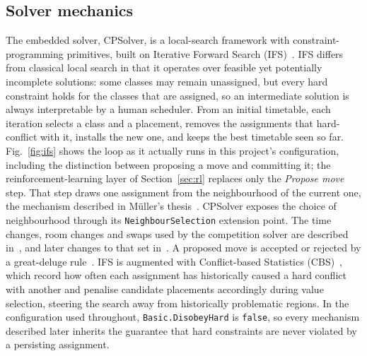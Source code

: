 \documentclass[journal]{IEEEtran}
\begin{document}
\subsection{Solver mechanics}
The embedded solver, CPSolver, is a local-search framework with constraint-programming primitives, built on Iterative Forward Search (IFS)~\cite{muller2004constraint}. IFS differs from classical local search in that it operates over feasible yet potentially incomplete solutions: some classes may remain unassigned, but every hard constraint holds for the classes that are assigned, so an intermediate solution is always interpretable by a human scheduler. From an initial timetable, each iteration selects a class and a placement, removes the assignments that hard-conflict with it, installs the new one, and keeps the best timetable seen so far. Fig.~\ref{fig:ifs} shows the loop as it actually runs in this project's configuration, including the distinction between proposing a move and committing it; the reinforcement-learning layer of Section~\ref{sec:rl} replaces only the \emph{Propose move} step. That step draws one assignment from the neighbourhood of the current one, the mechanism described in M\"uller's thesis~\cite{muller2005thesis}. CPSolver exposes the choice of neighbourhood through its \texttt{NeighbourSelection} extension point. The time changes, room changes and swaps used by the competition solver are described in~\cite{muller2009itc}, and later changes to that set in~\cite{muller2016evolution}. A proposed move is accepted or rejected by a great-deluge rule~\cite{dueck1993deluge}. IFS is augmented with Conflict-based Statistics (CBS)~\cite{muller2004constraint}, which record how often each assignment has historically caused a hard conflict with another and penalise candidate placements accordingly during value selection, steering the search away from historically problematic regions. In the configuration used throughout, \texttt{Basic.DisobeyHard} is \texttt{false}, so every mechanism described later inherits the guarantee that hard constraints are never violated by a persisting assignment.
\end{document}
